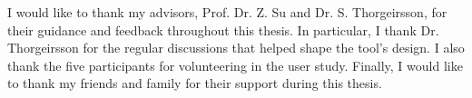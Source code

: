 I would like to thank my advisors, Prof. Dr. Z. Su and Dr. S. Thorgeirsson, for their guidance and feedback throughout this thesis. In particular, I thank Dr. Thorgeirsson for the regular discussions that helped shape the tool's design. I also thank the five participants for volunteering in the user study. Finally, I would like to thank my friends and family for their support during this thesis.